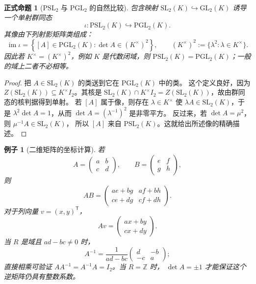 \documentclass[UTF8,fontset=none,a4paper,11pt]{ctexart}
\theoremstyle{foundation-definition}
\theoremstyle{foundation-theorem}
\theoremstyle{foundation-proposition}
\newtheorem{proposition}[definition]{正式命题}
\theoremstyle{foundation-example}
\newtheorem{example}[definition]{例子}
\theoremstyle{foundation-remark}
\theoremstyle{foundation-theorem}
\begin{document}
\begin{proposition}[\(\mathrm{PSL}_2\) 与 \(\mathrm{PGL}_2\) 的自然比较]\label{prop:psl-pgl-comparison}
包含映射 \(\mathrm{SL}_2(K)\hookrightarrow\mathrm{GL}_2(K)\) 诱导一个单射群同态
\[
\iota:\mathrm{PSL}_2(K)\hookrightarrow\mathrm{PGL}_2(K).
\]
其像由下列射影矩阵类组成：
\[
\operatorname{im}\iota
=\left\{[A]\in\mathrm{PGL}_2(K):
\det A\in (K^\times)^2\right\},
\qquad
(K^\times)^2:=\{\lambda^2:\lambda\in K^\times\}.
\]
因此若 \(K^\times=(K^\times)^2\)，例如 \(K\) 是代数闭域，则
\(\mathrm{PSL}_2(K)=\mathrm{PGL}_2(K)\)；一般的域上二者不必相等。
\end{proposition}

\begin{proof}
把 \(A\in\mathrm{SL}_2(K)\) 的类送到它在 \(\mathrm{PGL}_2(K)\) 中的类。
这个定义良好，因为 \(Z(\mathrm{SL}_2(K))\subseteq K^\times I_2\)。其核是
\(\mathrm{SL}_2(K)\cap K^\times I_2=Z(\mathrm{SL}_2(K))\)，故由群同态的核判据得到单射。
若 \([A]\) 属于像，则存在 \(\lambda\in K^\times\) 使
\(\lambda A\in\mathrm{SL}_2(K)\)，于是
\(\lambda^2\det A=1\)，从而 \(\det A=(\lambda^{-1})^2\) 是非零平方。
反过来，若 \(\det A=\mu^2\)，则 \(\mu^{-1}A\in\mathrm{SL}_2(K)\)，
所以 \([A]\) 来自 \(\mathrm{PSL}_2(K)\)。这就给出所述像的精确描述。
\end{proof}

\begin{example}[二维矩阵的坐标计算]
若
\[
A=\begin{pmatrix}a&b\\c&d\end{pmatrix},\qquad
B=\begin{pmatrix}e&f\\g&h\end{pmatrix},
\]
则
\[
AB=
\begin{pmatrix}
ae+bg&af+bh\\
ce+dg&cf+dh
\end{pmatrix}.
\]
对于列向量 \(v=(x,y)^{\mathsf T}\)，
\[
Av=
\begin{pmatrix}ax+by\\cx+dy\end{pmatrix}.
\]
当 \(R\) 是域且 \(ad-bc\neq0\) 时，
\[
A^{-1}=\frac1{ad-bc}
\begin{pmatrix}d&-b\\-c&a\end{pmatrix};
\]
直接相乘可验证 \(AA^{-1}=A^{-1}A=I_2\)。当 \(R=\mathbb Z\) 时，
\(\det A=\pm1\) 才能保证这个逆矩阵仍具有整数系数。
\end{example}
\end{document}

